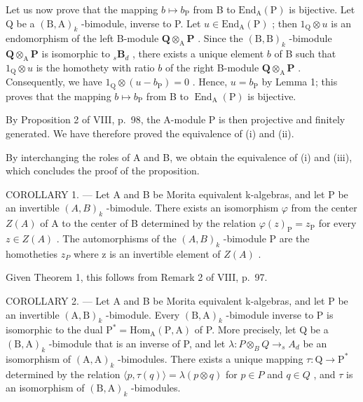 Let us now prove that the mapping \(b \mapsto b_{\mathrm{P}}\) from B to \(\mathrm{End}_{\mathrm{A}}(\mathrm{P})\) is bijective. Let Q be a \((\mathrm{B},\mathrm{A})_k\) -bimodule, inverse to P. Let \(u \in \mathrm{End}_{\mathrm{A}}(\mathrm{P})\) ; then \(1_{\mathrm{Q}} \otimes u\) is an endomorphism of the left B-module \(\mathbf{Q} \otimes_{\mathrm{A}} \mathbf{P}\) . Since the \((\mathrm{B},\mathrm{B})_k\) -bimodule \(\mathbf{Q} \otimes_{\mathrm{A}} \mathbf{P}\) is isomorphic to \({}_s\mathbf{B}_d\) , there exists a unique element \(b\) of B such that \(1_{\mathrm{Q}} \otimes u\) is the homothety with ratio \(b\) of the right B-module \(\mathbf{Q} \otimes_{\mathrm{A}} \mathbf{P}\) . Consequently, we have \(1_{\mathrm{Q}} \otimes (u - b_{\mathrm{P}}) = 0\) . Hence, \(u = b_{\mathrm{P}}\) by Lemma 1; this proves that the mapping \(b \mapsto b_{\mathrm{P}}\) from B to \(\operatorname{End}_{\mathrm{A}}(\mathrm{P})\) is bijective.

By Proposition 2 of VIII, p.~98, the A-module P is then projective and finitely generated. We have therefore proved the equivalence of (i) and (ii).

By interchanging the roles of A and B, we obtain the equivalence of (i) and (iii), which concludes the proof of the proposition.

COROLLARY 1. --- Let A and B be Morita equivalent k-algebras, and let P be an invertible \((A,B)_{k}\) -bimodule. There exists an isomorphism \(\varphi\) from the center \(Z(A)\) of A to the center of B determined by the relation \(\varphi(z)_{\mathrm{P}} = z_{\mathrm{P}}\) for every \(z \in Z(A)\) . The automorphisms of the \((A,B)_{k}\) -bimodule P are the homotheties \(z_{P}\) where z is an invertible element of \(Z(A)\) .

Given Theorem 1, this follows from Remark 2 of VIII, p.~97.

COROLLARY 2. --- Let A and B be Morita equivalent k-algebras, and let P be an invertible \((\mathrm{A},\mathrm{B})_{k}\) -bimodule. Every \((\mathrm{B},\mathrm{A})_{k}\) -bimodule inverse to P is isomorphic to the dual \(\mathrm{P}^{*}=\mathrm{Hom}_{\mathrm{A}}(\mathrm{P},\mathrm{A})\) of P. More precisely, let Q be a \((\mathrm{B},\mathrm{A})_{k}\) -bimodule that is an inverse of P, and let \(\lambda:P\otimes_{B}Q\to_{s}A_{d}\) be an isomorphism of \((\mathrm{A},\mathrm{A})_{k}\) -bimodules. There exists a unique mapping \(\tau:\mathrm{Q}\to\mathrm{P}^{*}\) determined by the relation \(\langle p,\tau(q)\rangle=\lambda(p\otimes q)\) for \(p\in P\) and \(q\in Q\) , and \(\tau\) is an isomorphism of \((\mathrm{B},\mathrm{A})_{k}\) -bimodules.

